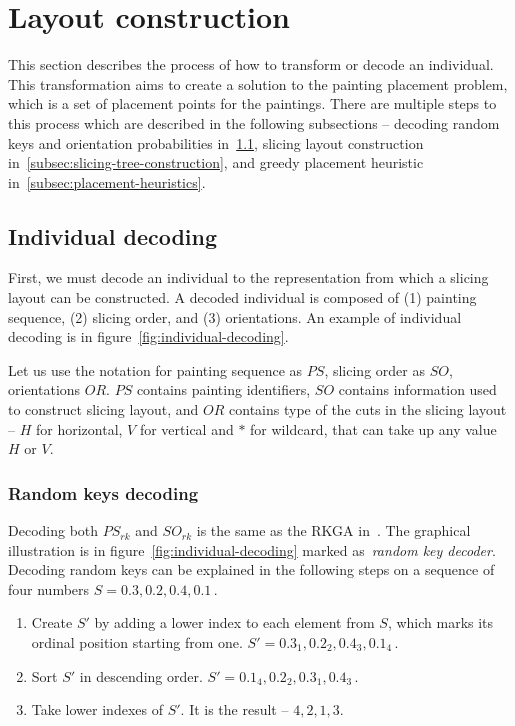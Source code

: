 \section{Layout construction}\label{sec:layout-construction}

This section describes the process of how to transform or decode an individual.
This transformation aims to create a solution to the painting placement problem,
which is a set of placement points for the paintings.
There are multiple steps to this process which are described in the following subsections
– decoding random keys and orientation probabilities in~\ref{subsec:individual-decoding},
slicing layout construction in~\ref{subsec:slicing-tree-construction},
and greedy placement heuristic in~\ref{subsec:placement-heuristics}.

\subsection{Individual decoding}\label{subsec:individual-decoding}
First, we must decode an individual to the representation from which a slicing layout can be constructed.
A decoded individual is composed of (1) painting sequence, (2) slicing order, and (3) orientations.
An example of individual decoding is in figure~\ref{fig:individual-decoding}.

Let us use the notation for painting sequence as $PS$, slicing order as $SO$, orientations $OR$.
$PS$ contains painting identifiers, $SO$ contains information used to construct slicing layout,
and $OR$ contains type of the cuts in the slicing layout – $H$ for horizontal, $V$ for vertical
and $*$ for wildcard, that can take up any value $H$ or $V$.

\subsubsection*{Random keys decoding}
Decoding both $PS_{rk}$ and $SO_{rk}$ is the same as the RKGA in~\cite{beanGeneticAlgorithmsRandom1994}.
The graphical illustration is in figure~\ref{fig:individual-decoding} marked as~\textit{random key decoder}.
Decoding random keys can be explained in the following steps on a sequence of four numbers $S = 0.3, 0.2, 0.4, 0.1$\,.

\begin{enumerate}
    \item Create $S'$ by adding a lower index to each element from $S$, which marks its ordinal position starting from one.
    $S' = 0.3_1, 0.2_2, 0.4_3, 0.1_4$\,.
    \item Sort $S'$ in descending order. $S' = 0.1_4, 0.2_2,  0.3_1, 0.4_3$\,.
    \item Take lower indexes of $S'$.
    It is the result – $4, 2, 1, 3$.
\end{enumerate}


